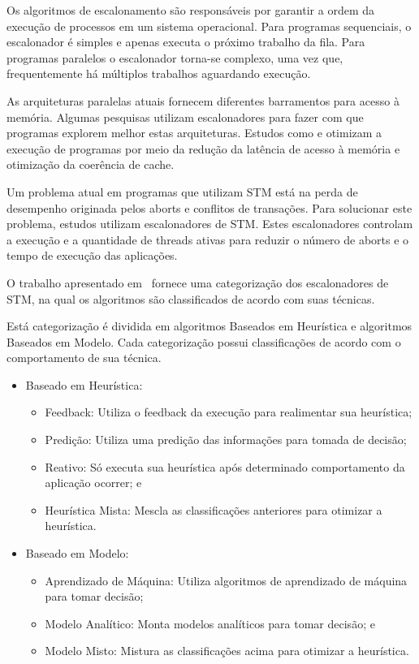 \documentclass[diss,capa]{texufpel}
\begin{document}
Os algoritmos de escalonamento são responsáveis por garantir a ordem da execução de processos em um sistema operacional. Para programas sequenciais, o escalonador é simples e apenas executa o próximo trabalho da fila. Para programas paralelos o escalonador torna-se complexo, uma vez que, frequentemente há múltiplos trabalhos aguardando execução.

As arquiteturas paralelas atuais fornecem diferentes barramentos para acesso à memória. Algumas pesquisas utilizam escalonadores para fazer com que programas explorem melhor estas arquiteturas. Estudos como \cite{Rodolfo:2014} e \cite{pasqualin2020online} otimizam a execução de programas por meio da redução da latência de acesso à memória e otimização da coerência de cache.

Um problema atual em programas que utilizam STM está na perda de desempenho originada pelos aborts e conflitos de transações. Para solucionar este problema, estudos utilizam escalonadores de STM. Estes escalonadores controlam a execução e a quantidade de threads ativas para reduzir o número de aborts e o tempo de execução das aplicações.

O trabalho apresentado em~\cite{disanzo2017} fornece uma categorização dos escalonadores de STM, na qual os algoritmos são classificados de acordo com suas técnicas.

Está categorização é dividida em algoritmos Baseados em Heurística e algoritmos Baseados em Modelo. Cada categorização possui classificações de acordo com o comportamento de sua técnica.

\begin{itemize}
 \item Baseado em Heurística:
 \begin{itemize}
     \item Feedback: Utiliza o feedback da execução para realimentar sua heurística;
     \item Predição: Utiliza uma predição das informações para tomada de decisão;
     \item Reativo: Só executa sua heurística após determinado comportamento da aplicação ocorrer; e
     \item Heurística Mista: Mescla as classificações anteriores para otimizar a heurística.
 \end{itemize}
 \item Baseado em Modelo:
 \begin{itemize}
     \item Aprendizado de Máquina: Utiliza algoritmos de aprendizado de máquina para tomar decisão;
     \item Modelo Analítico: Monta modelos analíticos para tomar decisão; e
     \item Modelo Misto: Mistura as classificações acima para otimizar a heurística.
 \end{itemize}
\end{itemize}
\end{document}
